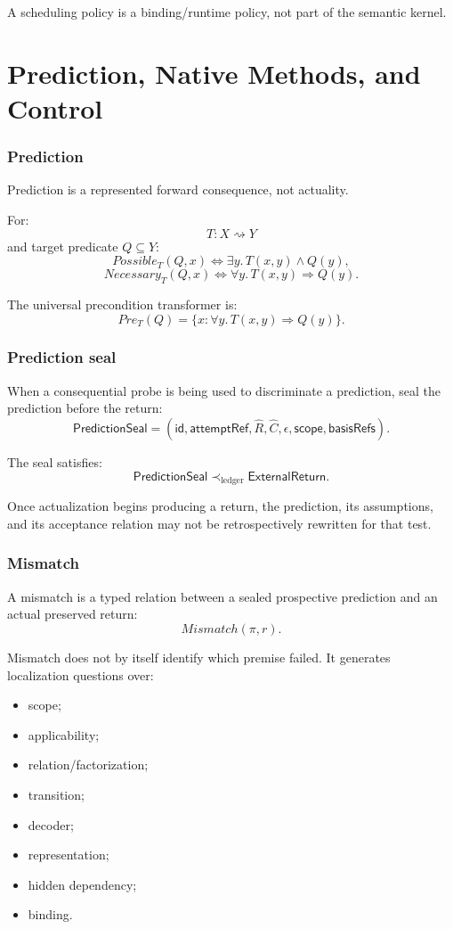 \documentclass[11pt,oneside]{article}
\begin{document}
A scheduling policy is a binding/runtime policy, not part of the semantic kernel.


\part{Prediction, Native Methods, and Control}

\section{Prediction}

Prediction is a represented forward consequence, not actuality.

For:
\[
T:X\rightsquigarrow Y
\]
and target predicate \(Q\subseteq Y\):
\[
\boxed{
Possible_T(Q,x)
\iff
\exists y.\,T(x,y)\land Q(y),
}
\]
\[
\boxed{
Necessary_T(Q,x)
\iff
\forall y.\,T(x,y)\Rightarrow Q(y).
}
\]

The universal precondition transformer is:
\[
\boxed{
Pre_T(Q)
=
\{x:
\forall y.\,T(x,y)\Rightarrow Q(y)
\}.
}
\]

\section{Prediction seal}

When a consequential probe is being used to discriminate a prediction, seal the prediction before the return:
\[
\boxed{
\mathsf{PredictionSeal}
=
(
\mathsf{id},
\mathsf{attemptRef},
\widehat R,
\widehat C,
\epsilon,
\mathsf{scope},
\mathsf{basisRefs}
).
}
\]

The seal satisfies:
\[
\boxed{
\mathsf{PredictionSeal}
\prec_{\mathrm{ledger}}
\mathsf{ExternalReturn}.
}
\]

Once actualization begins producing a return, the prediction, its assumptions, and its acceptance relation may not be retrospectively rewritten for that test.

\section{Mismatch}

A mismatch is a typed relation between a sealed prospective prediction and an actual preserved return:
\[
\boxed{
Mismatch(\pi,r).
}
\]

Mismatch does not by itself identify which premise failed.  It generates localization questions over:
\begin{itemize}
\item scope;
\item applicability;
\item relation/factorization;
\item transition;
\item decoder;
\item representation;
\item hidden dependency;
\item binding.
\end{itemize}
\end{document}
